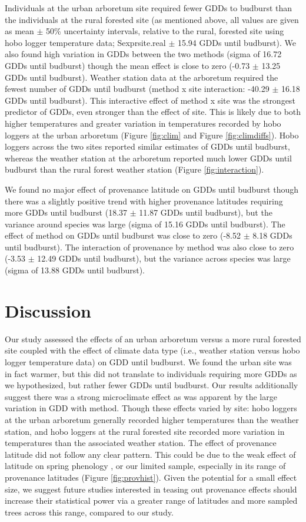 \documentclass{article}\usepackage[]{graphicx}\usepackage[]{color}
\begin{document}
Individuals at the urban arboretum site required fewer GDDs to budburst than the individuals at the rural forested site (as mentioned above, all values are given as mean $\pm$ 50\% uncertainty intervals, relative to the rural, forested site using hobo logger temperature data; Sexpr{site.real} $\pm$ 15.94 GDDs until budburst). We also found high variation in GDDs between the two methods (sigma of 16.72 GDDs until budburst) though the mean effect is close to zero (-0.73 $\pm$ 13.25 GDDs until budburst). Weather station data at the arboretum required the fewest number of GDDs until budburst (method x site interaction: -40.29 $\pm$ 16.18 GDDs until budburst). This interactive effect of method x site was the strongest predictor of GDDs, even stronger than the effect of site. This is likely due to both higher temperatures and greater variation in temperatures recorded by hobo loggers at the urban arboretum (Figure \ref{fig:clim} and Figure \ref{fig:climdiffs}). Hobo loggers across the two sites reported similar estimates of GDDs until budburst, whereas the weather station at the arboretum reported much lower GDDs until budburst than the rural forest weather station (Figure \ref{fig:interaction}).

We found no major effect of provenance latitude on GDDs until budburst though there was a slightly positive trend with higher provenance latitudes requiring more GDDs until budburst (18.37 $\pm$ 11.87 GDDs until budburst), but the variance around species was large (sigma of 15.16 GDDs until budburst). The effect of method on GDDs until budburst was close to zero (-8.52 $\pm$ 8.18 GDDs until budburst). The interaction of provenance by method was also close to zero (-3.53 $\pm$ 12.49 GDDs until budburst), but the variance across species was large (sigma of 13.88 GDDs until budburst).

\section*{Discussion} 
Our study assessed the effects of an urban arboretum versus a more rural forested site coupled with the effect of climate data type (i.e., weather station versus hobo logger temperature data) on GDD until budburst. We found the urban site was in fact warmer, but this did not translate to individuals requiring more GDDs as we hypothesized, but rather fewer GDDs until budburst. Our results additionally suggest there was a strong microclimate effect as was apparent by the large variation in GDD with method. Though these effects varied by site: hobo loggers at the urban arboretum generally recorded higher temperatures than the weather station, and hobo loggers at the rural forested site recorded more variation in temperatures than the associated weather station. The effect of provenance latitude did not follow any clear pattern. This could be due to the weak effect of latitude on spring phenology \citep{Gauzere2017}, or our limited sample, especially in its range of provenance latitudes (Figure \ref{fig:provhist}). Given the potential for a small effect size, we suggest future studies interested in teasing out provenance effects should increase their statistical power via a greater range of latitudes and more sampled trees across this range, compared to our study. 
\end{document}
